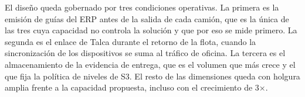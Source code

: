 El diseño queda gobernado por tres condiciones operativas. La primera es la emisión de guías del ERP antes de la salida de cada camión, que es la única de las tres cuya capacidad no controla la solución y que por eso se mide primero. La segunda es el enlace de Talca durante el retorno de la flota, cuando la sincronización de los dispositivos se suma al tráfico de oficina. La tercera es el almacenamiento de la evidencia de entrega, que es el volumen que más crece y el que fija la política de niveles de S3. El resto de las dimensiones queda con holgura amplia frente a la capacidad propuesta, incluso con el crecimiento de 3×.
